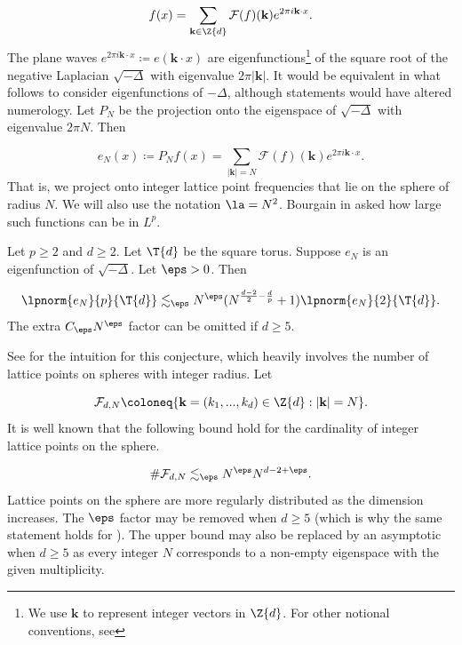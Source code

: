 \documentclass[11pt]{amsart}
\begin{document}
\begin{equation}
    f(x) = \sum_{\mathbf{k}\in\Z{d}}\mathcal{F}(f)(\mathbf{k})e^{2\pi i \mathbf{k} \cdot x}.
\end{equation}
The plane waves $e^{2\pi i \mathbf{k}\cdot x}\coloneq e(\mathbf{k}\cdot x)$ are eigenfunctions\footnote{We use $\mathbf{k}$ to represent integer vectors in $\Z{d}$. For other notional conventions, see } of the square root of the negative Laplacian $\sqrt{-\Delta}$ with eigenvalue $2\pi |\mathbf{k}|$. It would be equivalent in what follows to consider eigenfunctions of $-\Delta$, although statements would have altered numerology. Let $P_N$ be the projection onto the eigenspace of  $\sqrt{-\Delta}$ with eigenvalue $2\pi N$. Then 

\begin{equation}\label{1: eSpaceProjectorDefEqn}
    e_N(x) \coloneq P_N f(x) = \sum_{|\mathbf{k}|=N}\mathcal{F}(f)(\mathbf{k})e^{2\pi i \mathbf{k} \cdot x}.
\end{equation}
That is, we project onto integer lattice point frequencies that lie on the sphere of radius $N$. We will also use the notation $\la = N^2$. Bourgain in \cite{bourgainTorusEFunc1993} asked how large such functions can be in $L^p$.

\begin{conjecture}\label{1: DiscreteRestrictionConj}
    Let $p\geq 2$ and $d\geq 2$. Let $\T{d}$ be the square torus. Suppose $e_N$ is an eigenfunction of  $\sqrt{-\Delta}$. Let $\eps>0$. Then 

    \begin{equation}\label{1: DiscreteRestrictionEqn}
        \lpnorm{e_N}{p}{\T{d}}\lesssim_{\eps} N^\eps(N^{\frac{d-2}{2}-\frac{d}{p}}+1)\lpnorm{e_N}{2}{\T{d}}.
    \end{equation}
    The extra $C_\eps N^\eps$ factor can be omitted if $d\geq 5$.
\end{conjecture}
See  for the intuition for this conjecture, which heavily involves the number of lattice points on spheres with integer radius. Let

\begin{equation*}
    \mathcal{F}_{d,N}\coloneq \{\mathbf{k}=(k_1,...,k_d)\in\Z{d}: |\mathbf k|=N\}.
\end{equation*}
It is well known that the following bound hold for the cardinality of integer lattice points on the sphere.

\begin{equation}
    \# \mathcal{F}_{d,N} \lesssim_\eps N^\eps N^{d-2+\eps}.
\end{equation}
Lattice points on the sphere are more regularly distributed as the dimension increases. The $\eps$ factor may be removed when $d\geq 5$ (which is why the same statement holds for ). The upper bound may also be replaced by an asymptotic when $d\geq 5$ as every integer $N$ corresponds to a non-empty eigenspace with the given multiplicity. 
\end{document}
